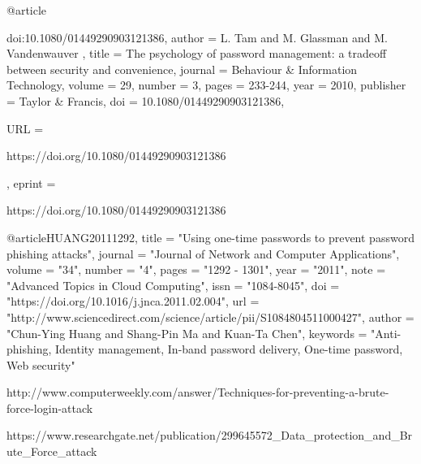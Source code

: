 


@article{doi:10.1080/01449290903121386,
author = { L.   Tam  and  M.   Glassman  and  M.   Vandenwauver },
title = {The psychology of password management: a tradeoff between security and convenience},
journal = {Behaviour \& Information Technology},
volume = {29},
number = {3},
pages = {233-244},
year  = {2010},
publisher = {Taylor & Francis},
doi = {10.1080/01449290903121386},

URL = { 
        https://doi.org/10.1080/01449290903121386
    
},
eprint = { 
        https://doi.org/10.1080/01449290903121386
    
}

}


@article{HUANG20111292,
title = "Using one-time passwords to prevent password phishing attacks",
journal = "Journal of Network and Computer Applications",
volume = "34",
number = "4",
pages = "1292 - 1301",
year = "2011",
note = "Advanced Topics in Cloud Computing",
issn = "1084-8045",
doi = "https://doi.org/10.1016/j.jnca.2011.02.004",
url = "http://www.sciencedirect.com/science/article/pii/S1084804511000427",
author = "Chun-Ying Huang and Shang-Pin Ma and Kuan-Ta Chen",
keywords = "Anti-phishing, Identity management, In-band password delivery, One-time password, Web security"
}


http://www.computerweekly.com/answer/Techniques-for-preventing-a-brute-force-login-attack

https://www.researchgate.net/publication/299645572_Data_protection_and_Brute_Force_attack


